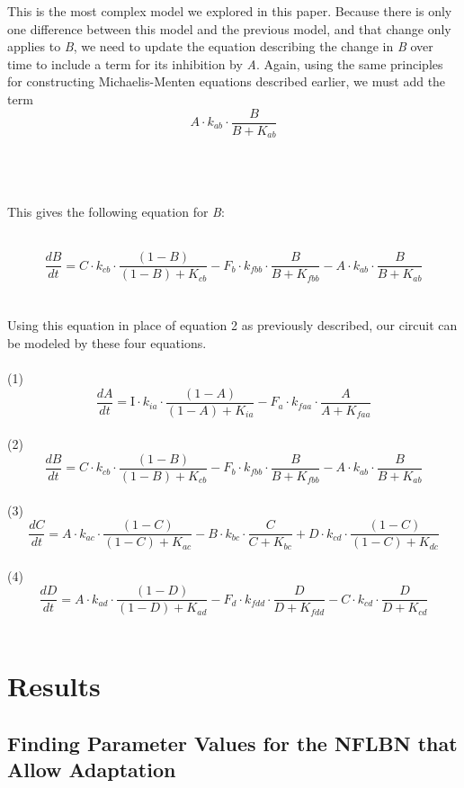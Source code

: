 \documentclass{article}
\begin{document}
This is the most complex model we explored in this paper. Because there is only one difference between this model and the previous model, and that change only applies to \textit{B}, we need to update the equation describing the change in \textit{B} over time to include a term for its inhibition by \textit{A}. Again, using the same principles for constructing Michaelis-Menten equations described earlier, we must add the term
\\

\[A \cdot k_{ab} \cdot \frac{B}{B + K_{ab}}\]

\\
\\
\\
This gives the following equation for \textit{B}:

\\
\[
\frac{dB}{dt} = C \cdot k_{cb} \cdot \frac{(1 - B)}{(1 - B) + K_{cb}} - F_b \cdot k_{fbb} \cdot \frac{B}{B + K_{fbb}} - A \cdot k_{ab} \cdot \frac{B}{B + K_{ab}}
\]
\\
\\

Using this equation in place of equation 2 as previously described, our circuit can be modeled by these four equations. 
\\
\\
(1)
\[
\frac{dA}{dt} = \text{I} \cdot k_{ia} \cdot \frac{(1 - A)}{(1 - A) + K_{ia}} - F_a \cdot k_{faa} \cdot \frac{A}{A + K_{faa}}
\]
\\
(2)
\[
\frac{dB}{dt} = C \cdot k_{cb} \cdot \frac{(1 - B)}{(1 - B) + K_{cb}} - F_b \cdot k_{fbb} \cdot \frac{B}{B + K_{fbb}} - A \cdot k_{ab} \cdot \frac{B}{B + K_{ab}}
\]
\\
(3)
\[
\frac{dC}{dt} = A \cdot k_{ac} \cdot \frac{(1 - C)}{(1 - C) + K_{ac}} - B \cdot k_{bc} \cdot \frac{C}{C + K_{bc}} + D \cdot k_{cd} \cdot \frac{(1 - C)}{(1 - C) + K_{dc}}
\]
\\
(4)
\[
\frac{dD}{dt} = A \cdot k_{ad} \cdot \frac{(1 - D)}{(1 - D) + K_{ad}} - F_d \cdot k_{fdd} \cdot \frac{D}{D + K_{fdd}} - C \cdot k_{cd} \cdot \frac{D}{D + K_{cd}}
\]
\\

\section{Results}

\subsection{Finding Parameter Values for the NFLBN that Allow Adaptation}
\end{document}
